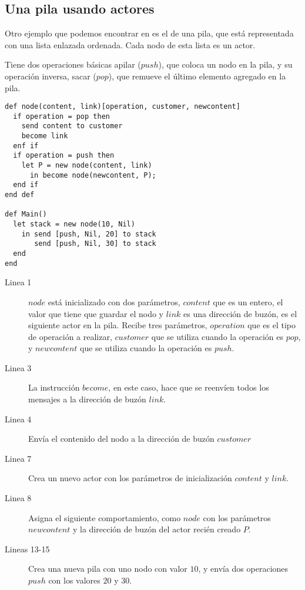 \subsection{Una pila usando actores}

Otro ejemplo que podemos encontrar en \cite{Agha:1986:AMC:7929} es el de una pila, que está representada con una lista enlazada ordenada. Cada nodo de esta lista es un actor. 

Tiene dos operaciones básicas apilar ($push$), que coloca un nodo en la pila, y su operación inversa, sacar ($pop$), que remueve el último elemento agregado en la pila.

\begin{lstlisting}[language=sal, style=simple]
def node(content, link)[operation, customer, newcontent]
  if operation = pop then
    send content to customer
    become link
  enf if
  if operation = push then
    let P = new node(content, link)
      in become node(newcontent, P);
  end if
end def

def Main() 
  let stack = new node(10, Nil)
    in send [push, Nil, 20] to stack 
       send [push, Nil, 30] to stack
  end
end
\end{lstlisting}

\begin{description}

\item [Linea 1] $node$ está inicializado con dos parámetros, $content$ que es un entero, el valor que tiene que guardar el nodo y  $link$ es una dirección de buzón, es el siguiente actor en la pila. Recibe tres parámetros, $operation$ que es el tipo de operación a realizar,  $customer$ que se utiliza cuando la operación es $pop$, y $newcontent$ que se utiliza cuando la operación es $push$.
\item [Linea 3] La instrucción $become$, en este caso, hace que se reenvíen todos los mensajes a la dirección de buzón $link$. 
\item [Linea 4] Envía el contenido del nodo a la dirección de buzón $customer$
\item [Linea 7] Crea un nuevo actor con los parámetros de inicialización $content$ y $link$.
\item [Linea 8] Asigna el siguiente comportamiento, como $node$ con los parámetros $newcontent$ y la dirección de buzón del actor recién creado $P$. 
\item [Lineas 13-15] Crea una nueva pila con uno nodo con valor $10$, y envía dos operaciones $push$ con los valores $20$ y $30$.
\end{description}

